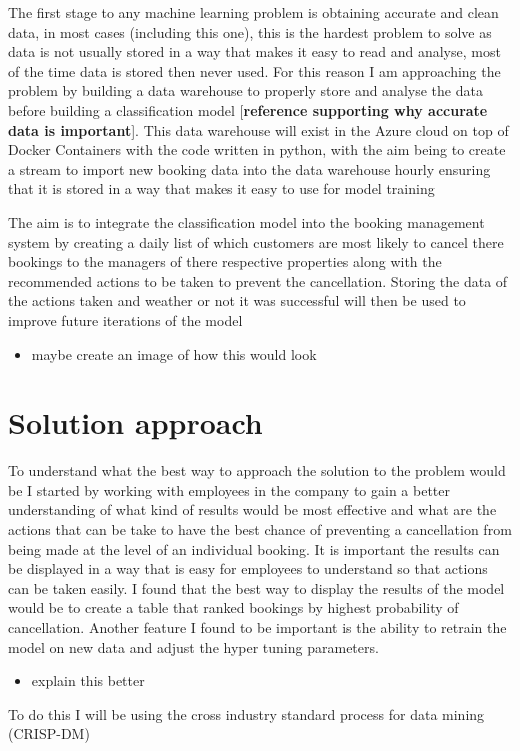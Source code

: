 The first stage to any machine learning problem is obtaining accurate and clean data, in most cases (including this one), this is the hardest problem to solve as data is not usually stored in a way that makes it easy to read and analyse, most of the time data is stored  then never used. For this reason I am approaching the problem by building a data warehouse to properly store and analyse the data before building a classification model [\textbf{reference supporting why accurate data is important}]. This data warehouse will exist in the Azure cloud on top of Docker Containers with the code written in python, with the aim being to create a stream to import new booking data into the data warehouse hourly ensuring that it is stored in a way that makes it easy to use for model training

The aim is to integrate the classification model into the booking management system by creating a daily list of which customers are most likely to cancel there bookings to the managers of there respective properties along with the recommended actions to be taken to prevent the cancellation. Storing the data of the actions taken and weather or not it was successful will then be used to improve future iterations of the model

\begin{itemize}
\item maybe create an image of how this would look
\end{itemize}



\section{Solution approach}

To understand what the best way to approach the solution to the problem would be I started by working with employees in the company to gain a better understanding of what kind of results would be most effective and what are the actions that can be take to have the best chance of preventing a cancellation from being made at the level of an individual booking. It is important the results can be displayed in a way that is easy for employees to understand so that actions can be taken easily. I found that the best way to display the results of the model would be to create a table that ranked bookings by highest probability of cancellation. Another feature I found to be important is the ability to retrain the model on new data and adjust the hyper tuning parameters.
\begin{itemize}
\item explain this better
\end{itemize}
To do this I will be using the cross industry standard process for data mining (CRISP-DM)


